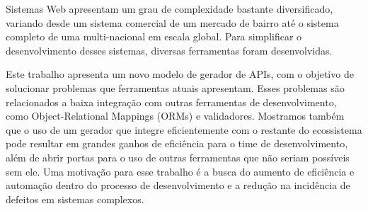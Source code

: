 Sistemas Web apresentam um grau de complexidade bastante diversificado, variando desde
um sistema comercial de um mercado de bairro até o sistema completo de uma multi-nacional
em escala global. Para simplificar o desenvolvimento desses sistemas, diversas ferramentas
foram desenvolvidas.

Este trabalho apresenta um novo modelo de gerador de APIs, com o objetivo de solucionar
problemas que ferramentas atuais apresentam. Esses problemas são relacionados a baixa
integração com outras ferramentas de desenvolvimento, como Object-Relational Mappings
(ORMs) e validadores. Mostramos também que o uso de um gerador que integre eficientemente
com o restante do ecossistema pode resultar em grandes ganhos de eficiência para o time de
desenvolvimento, além de abrir portas para o uso de outras ferramentas que não seriam possíveis
sem ele. Uma motivação para esse trabalho é a busca do aumento de eficiência e automação dentro
do processo de desenvolvimento e a redução na incidência de defeitos em sistemas complexos.
